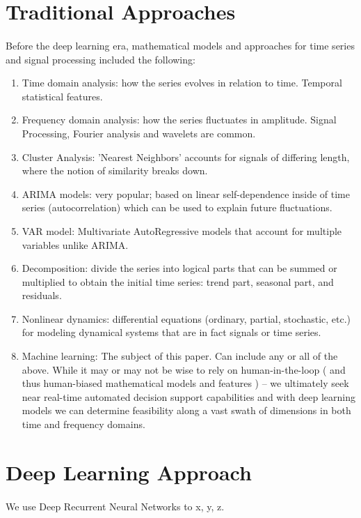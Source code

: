\documentclass{article}
\begin{document}
\section{Traditional Approaches}
\paragraph{}
Before the deep learning era, mathematical models and approaches for time series and signal processing included the following:

\begin{enumerate}
    \item Time domain analysis: how the series evolves in relation to time. Temporal statistical features.
    \item Frequency domain analysis: how the series fluctuates in amplitude. Signal Processing, Fourier analysis and wavelets are common.
    \item Cluster Analysis: 'Nearest Neighbors' accounts for signals of differing length, where the notion of similarity breaks down.
    \item ARIMA models: very popular; based on linear self-dependence inside of time series (autocorrelation) which can be used to explain future fluctuations.
    \item VAR model: Multivariate AutoRegressive models that account for multiple variables unlike ARIMA.
    \item Decomposition: divide the series into logical parts that can be summed or multiplied to obtain the initial time series: trend part, seasonal part, and residuals.
    \item Nonlinear dynamics: differential equations (ordinary, partial, stochastic, etc.) for modeling dynamical systems that are in fact signals or time series.
    \item Machine learning: The subject of this paper. Can include any or all of the above. While it may or may not be wise to rely on human-in-the-loop ( and thus human-biased mathematical models and features ) – we ultimately seek near real-time automated decision support capabilities and with deep learning models we can determine feasibility along a vast swath of dimensions in both time and frequency domains.
\end{enumerate}

\section{Deep Learning Approach}
\paragraph{}We use Deep Recurrent Neural Networks to x, y, z.
\end{document}
